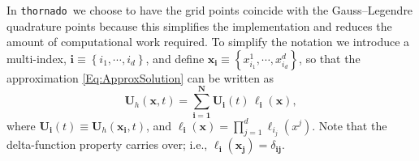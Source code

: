 \documentclass[letterpaper]{jpconf}
\newcommand{\thornado}{\texttt{thornado}}
\renewcommand{\bs}[1]{\boldsymbol{#1}}
\begin{document}
In \thornado\ we choose to have the grid points coincide with the Gauss--Legendre quadrature points because this simplifies the implementation and reduces the amount of computational work required. To simplify the notation we introduce a multi-index, $\bs{i}\equiv\left\{i_{1},\cdots,i_{d}\right\}$, and define $\bs{x}_{\bs{i}}\equiv\left\{x^{1}_{i_{1}},\cdots,x^{d}_{i_{d}}\right\}$, so that the approximation \eqref{Eq:ApproxSolution} can be written as
 \begin{equation}\label{Eq:Approx}
     \bs{U}_{h}\left(\bs{x},t\right)=\sum\limits_{\bs{i}=\bs{1}}^{\bs{N}}\bs{U}_{\bs{i}}\left(t\right)\,\ell_{\bs{i}}\left(\bs{x}\right),
 \end{equation}
 where $\bs{U}_{\bs{i}}\left(t\right)\equiv\bs{U}_{h}\left(\bs{x}_{\bs{i}},t\right)$, and $\ell_{\bs{i}}\left(\bs{x}\right)=\prod_{j=1}^{d}\ell_{i_{j}}\left(x^{j}\right)$. Note that the delta-function property carries over; i.e., $\ell_{\bs{i}}\left(\bs{x}_{\bs{j}}\right)=\delta_{\bs{ij}}$.

\end{document}
